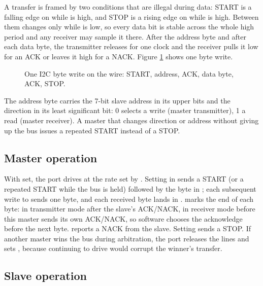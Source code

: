 A transfer is framed by two conditions that are illegal during data: START is a falling edge on  while  is high, and STOP is a rising edge on  while  is high. Between them  changes only while  is low, so every data bit is stable across the whole  high period and any receiver may sample it there. After the address byte and after each data byte, the transmitter releases  for one clock and the receiver pulls it low for an ACK or leaves it high for a NACK. Figure \ref{fig:i2c-transaction} shows one byte write.

\begin{figure}[htpb]
	\centering
	
	\caption{One I2C byte write on the wire: START, address, ACK, data byte, ACK, STOP.}
	\label{fig:i2c-transaction}
\end{figure}

The address byte carries the 7-bit slave address in its upper bits and the direction in its least significant bit: 0 selects a write (master transmitter), 1 a read (master receiver). A master that changes direction or address without giving up the bus issues a repeated START instead of a STOP.

\subsection{Master operation}

With  set, the port drives  at the rate set by . Setting  in  sends a START (or a repeated START while the bus is held) followed by the byte in ; each subsequent write to  sends one byte, and each received byte lands in .  marks the end of each byte: in transmitter mode after the slave's ACK/NACK, in receiver mode before this master sends its own ACK/NACK, so software chooses the acknowledge before the next byte.  reports a NACK from the slave. Setting  sends a STOP. If another master wins the bus during arbitration, the port releases the lines and sets , because continuing to drive would corrupt the winner's transfer.

\subsection{Slave operation}

